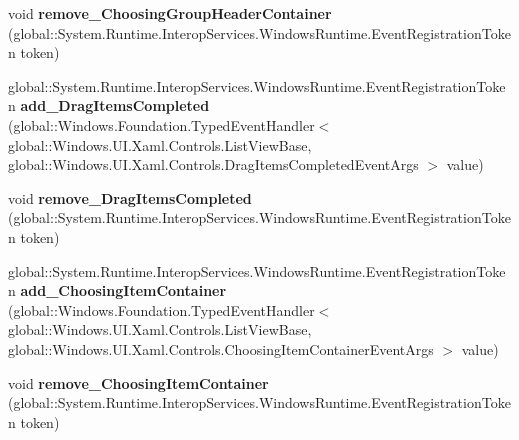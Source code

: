 \begin{DoxyCompactItemize}
\item 
\mbox{\label{interface_windows_1_1_u_i_1_1_xaml_1_1_controls_1_1_i_list_view_base4_acbca9310b039930aacfa0158b9dd0a63}} 
void {\bfseries remove\+\_\+\+Choosing\+Group\+Header\+Container} (global\+::\+System.\+Runtime.\+Interop\+Services.\+Windows\+Runtime.\+Event\+Registration\+Token token)
\item 
\mbox{\label{interface_windows_1_1_u_i_1_1_xaml_1_1_controls_1_1_i_list_view_base4_a8ded6e3ecc87209cec3cfd04f4282042}} 
global\+::\+System.\+Runtime.\+Interop\+Services.\+Windows\+Runtime.\+Event\+Registration\+Token {\bfseries add\+\_\+\+Drag\+Items\+Completed} (global\+::\+Windows.\+Foundation.\+Typed\+Event\+Handler$<$ global\+::\+Windows.\+U\+I.\+Xaml.\+Controls.\+List\+View\+Base, global\+::\+Windows.\+U\+I.\+Xaml.\+Controls.\+Drag\+Items\+Completed\+Event\+Args $>$ value)
\item 
\mbox{\label{interface_windows_1_1_u_i_1_1_xaml_1_1_controls_1_1_i_list_view_base4_aa8eed7aa7eefe8deffed7275d822d4ea}} 
void {\bfseries remove\+\_\+\+Drag\+Items\+Completed} (global\+::\+System.\+Runtime.\+Interop\+Services.\+Windows\+Runtime.\+Event\+Registration\+Token token)
\item 
\mbox{\label{interface_windows_1_1_u_i_1_1_xaml_1_1_controls_1_1_i_list_view_base4_a50b9a86d32b7a6ba60f5162b251de868}} 
global\+::\+System.\+Runtime.\+Interop\+Services.\+Windows\+Runtime.\+Event\+Registration\+Token {\bfseries add\+\_\+\+Choosing\+Item\+Container} (global\+::\+Windows.\+Foundation.\+Typed\+Event\+Handler$<$ global\+::\+Windows.\+U\+I.\+Xaml.\+Controls.\+List\+View\+Base, global\+::\+Windows.\+U\+I.\+Xaml.\+Controls.\+Choosing\+Item\+Container\+Event\+Args $>$ value)
\item 
\mbox{\label{interface_windows_1_1_u_i_1_1_xaml_1_1_controls_1_1_i_list_view_base4_ae03f9cc1626fb8ce344e627e8be05680}} 
void {\bfseries remove\+\_\+\+Choosing\+Item\+Container} (global\+::\+System.\+Runtime.\+Interop\+Services.\+Windows\+Runtime.\+Event\+Registration\+Token token)

\end{DoxyCompactItemize}
